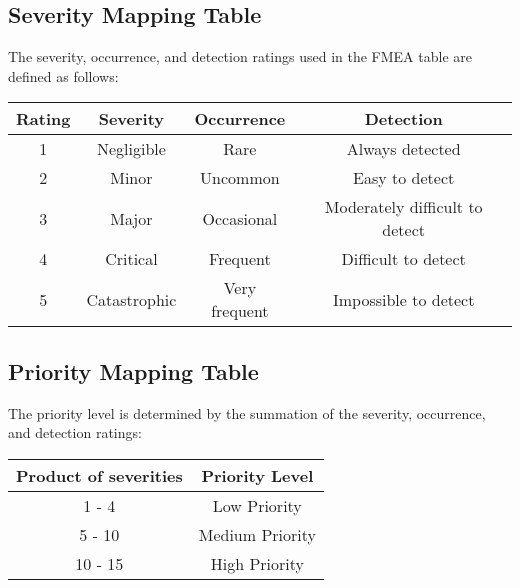 \documentclass{article}
\begin{document}
\subsection{Severity Mapping Table}
The severity, occurrence, and detection ratings used in the FMEA table are
defined as follows:
\begin{table}[H]
\begin{tabular}{c|c|c|c}

    Rating & Severity & Occurrence & Detection \\\hline
    1 & Negligible & Rare & Always detected \\\hline
    2 & Minor & Uncommon & Easy to detect \\ \hline
    3 & Major & Occasional & Moderately difficult to detect \\\hline
    4 & Critical & Frequent & Difficult to detect \\\hline
    5 & Catastrophic & Very frequent & Impossible to detect \\


\end{tabular}
\end{table}

\subsection{Priority Mapping Table}

The priority level is determined by the summation of the severity, occurrence,
and detection ratings:

\begin{table}[H]
    \begin{tabular}{c|c}
        Product of severities & Priority Level \\\hline
        1 - 4 & Low Priority \\\hline
        5 - 10 & Medium Priority \\\hline
        10 - 15 & High Priority \\

    \end{tabular}
\end{table}

\newpage
\pdfpagewidth=15in \pdfpageheight=11.5in
\end{document}

